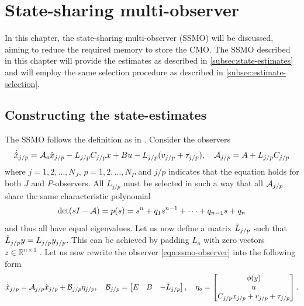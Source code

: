 \section{State-sharing multi-observer}\label{ch:ssmo}
In this chapter, the state-sharing multi-observer (SSMO) will be discussed, aiming to reduce the required memory to store the CMO. The SSMO described in this chapter will provide the estimates as described in \autoref{subsec:state-estimates} and will employ the same selection procedure as described in \autoref{subsec:estimate-selection}.

\subsection{Constructing the state-estimates}
The SSMO follows the definition as in \cite{Chong2023MemoryAlgorithms}. Consider the observers
\begin{equation}\label{eqn:ssmo-observer}
    \begin{split}
        \dot{\hat{x}}_{j/p} &= \mathcal{A}_o\hat{x}_{j/p} - L_{j/p}C_{j/p}x + Bu -L_{j/p}(v_{j/p} + \tau_{j/p}), \quad \mathcal{A}_{j/p}=A+L_{j/p}C_{j/p} \\
    \end{split}
\end{equation}
where $j=1,2,\dots,N_J$, $p=1,2,\dots,N_P$ and $j/p$ indicates that the equation holds for both $J$ and $P$-observers. All $L_{j/p}$ must be selected in such a way that all $\mathcal{A}_{j/p}$ share the same characteristic polynomial
\begin{equation}\label{eqn:ssmo-char-poly}
    \det(sI-\mathcal{A}) = p(s) = s^n + q_1s^{n-1} + \dots + q_{n-1}s + q_n
\end{equation}
and thus all have equal eigenvalues. Let us now define a matrix $\Tilde{L}_{j/p}$ such that $\Tilde{L}_{j/p}y=L_{j/p}y_{j/p}$. This can be achieved by padding $L_o$ with zero vectors $z \in \mathbb{R}^{n \times 1}$ \cite{Chong2023MemoryAlgorithms}. Let us now rewrite the observer \eqref{eqn:ssmo-observer} into the following form
\begin{equation}\label{eqn:ssmo-standard-system-form}
    \dot{\hat{x}}_{j/p} = \mathcal{A}_{j/p}\hat{x}_{j/p} + \mathcal{B}_{j/p}\eta_{j/p}, \quad
    \mathcal{B}_{j/p} =
    \begin{bmatrix}
        E & B & -\Tilde{L}_{j/p} \\
    \end{bmatrix}, \quad \eta_o =
    \begin{bmatrix}
        \phi(y) \\
        u \\
        C_{j/p}x_{j/p} + v_{j/p} + \tau_{j/p}
    \end{bmatrix}.
\end{equation}

